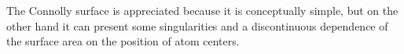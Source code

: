 \documentclass[11pt,a4paper]{article}
\begin{document}
\begin{figure}[H]
    \centering
    \quad
    \caption[]{}
    \label{fig:SES}
\end{figure}

The Connolly surface is appreciated because it is conceptually simple, but on the other hand it can present some singularities and a discontinuous dependence of the surface area on the position of atom centers. 
\end{document}
